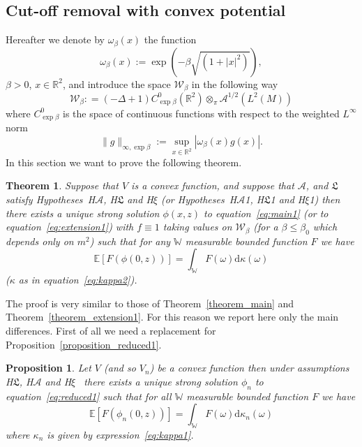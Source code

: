 \documentclass[a4paper,10pt]{article}
\newcommand{\assign}{:=}
\newcommand{\mathd}{\mathrm{d}}
\newtheorem{proposition}{Proposition}
{\theorembodyfont{\rmfamily}\newtheorem{remark}{Remark}}
\newtheorem{theorem}{Theorem}
\begin{document}
\subsection{Cut-off removal with convex
potential}\label{subsection_extension2}

Hereafter we denote by $\omega_{\beta} (x)$ the function
\begin{equation}
  \omega_{\beta} (x) \assign \exp (- \beta \sqrt{(1 + | x |^2)}),
  \label{eq:exponentialweight}
\end{equation}
$\beta > 0$, $x \in \mathbb{R}^2$, and introduce the space
$\mathcal{W}_{\beta}$ in the following way
\[ \mathcal{W}_{\beta} : = (- \Delta + 1) C^0_{\exp \beta} (\mathbb{R}^2)
   \otimes_{\pi} \mathcal{A}^{1 / 2} (L^2 (M)) \]
where $C^0_{\exp \beta}$ is the space of continuous functions with respect to
the weighted $L^{\infty}$ norm
\[ \| g \|_{\infty, \exp \beta} \assign \sup_{x \in \mathbb{R}^2} |
   \omega_{\beta} (x) g (x) | . \]
In this section we want to prove the following theorem.

\begin{theorem}
  \label{theorem_extension2}Suppose that $V$ is a convex function, and suppose
  that $\mathcal{A}$, and $\mathfrak{L}$ satisfy Hypotheses~H$\mathcal{A}$,
  H$\mathfrak{L}$ and H$\xi$ (or Hypotheses~H$\mathcal{A}$1, H$\mathfrak{L}$1
  and H$\xi$1) then there exists a unique strong solution $\phi (x, z)$ to
  equation~{\eqref{eq:main1}} (or to equation~{\eqref{eq:extension1}}) with $f
  \equiv 1$ taking values on $\mathcal{W}_{\beta}$ (for a $\beta \leqslant
  \beta_0$ which depends only on $m^2$) such that for any $\mathbb{W}$
  measurable bounded function $F$ we have
  \begin{equation}
    \mathbb{E} [F (\phi (0, z))] = \int_{\mathbb{W}} F (\omega) \mathd \kappa
    (\omega) \label{eq:extension4}
  \end{equation}
  ($\kappa$ as in equation~{\eqref{eq:kappa2}}).
\end{theorem}

The proof is very similar to those of Theorem~\ref{theorem_main} and
Theorem~\ref{theorem_extension1}. For this reason we report here only the main
differences. First of all we need a replacement for
Proposition~\ref{proposition_reduced1}.

\begin{proposition}
  \label{proposition_extension1}Let $V$ (and so $V_n$) be a convex function
  then under assumptions H$\mathfrak{L}$, H$\mathcal{A}$ and H$\xi$ \ there
  exists a unique strong solution $\phi_n$ to equation~{\eqref{eq:reduced1}}
  such that for all $\mathbb{W}$ measurable bounded function $F$ we have
  \begin{equation}
    \mathbb{E} [F (\phi_n (0, z))] = \int_{\mathbb{W}} F (\omega) \mathd
    \kappa_n (\omega) \label{eq:reduced9}
  \end{equation}
  where $\kappa_n$ is given by expression~{\eqref{eq:kappa1}}.
\end{proposition}
\end{document}
